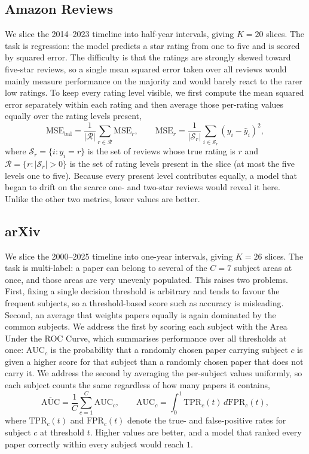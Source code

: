 \subsection{Amazon Reviews}
\label{app:metrics_amazon}
We slice the 2014--2023 timeline into half-year intervals, giving $K = 20$ slices. The task is regression: the model predicts a star rating from one to five and is scored by squared error. The difficulty is that the ratings are strongly skewed toward five-star reviews, so a single mean squared error taken over all reviews would mainly measure performance on the majority and would barely react to the rarer low ratings. To keep every rating level visible, we first compute the mean squared error separately within each rating and then average those per-rating values equally over the rating levels present,
\begin{equation}
    \nonumber
    \text{MSE}_{\text{bal}} = \frac{1}{|\mathcal{R}|}\sum_{r \in \mathcal{R}} \text{MSE}_r, \qquad
    \text{MSE}_r = \frac{1}{|\mathcal{S}_r|}\sum_{i \in \mathcal{S}_r}(y_i - \hat{y}_i)^2,
\end{equation}
where $\mathcal{S}_r = \{i : y_i = r\}$ is the set of reviews whose true rating is $r$ and $\mathcal{R} = \{r : |\mathcal{S}_r| > 0\}$ is the set of rating levels present in the slice (at most the five levels one to five). Because every present level contributes equally, a model that began to drift on the scarce one- and two-star reviews would reveal it here. Unlike the other two metrics, lower values are better.

\subsection{arXiv}
\label{app:metrics_arxiv}
We slice the 2000--2025 timeline into one-year intervals, giving $K = 26$ slices. The task is multi-label: a paper can belong to several of the $C = 7$ subject areas at once, and those areas are very unevenly populated. This raises two problems. First, fixing a single decision threshold is arbitrary and tends to favour the frequent subjects, so a threshold-based score such as accuracy is misleading. Second, an average that weights papers equally is again dominated by the common subjects. We address the first by scoring each subject with the Area Under the ROC Curve, which summarises performance over all thresholds at once: $\text{AUC}_c$ is the probability that a randomly chosen paper carrying subject $c$ is given a higher score for that subject than a randomly chosen paper that does not carry it. We address the second by averaging the per-subject values uniformly, so each subject counts the same regardless of how many papers it contains,
\begin{equation}
    \nonumber
    \overline{\text{AUC}} = \frac{1}{C}\sum_{c=1}^{C} \text{AUC}_c, \qquad
    \text{AUC}_c = \int_0^1 \text{TPR}_c(t)\, d\text{FPR}_c(t),
\end{equation}
where $\text{TPR}_c(t)$ and $\text{FPR}_c(t)$ denote the true- and false-positive rates for subject $c$ at threshold $t$. Higher values are better, and a model that ranked every paper correctly within every subject would reach $1$.

\tightvspace{\fill}
